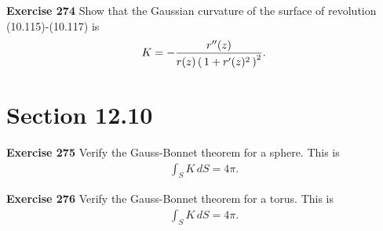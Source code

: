 \documentclass[12pt,a4paper]{report}
\begin{document}
\begin{description}
\item \textbf{Exercise 274} Show that the Gaussian curvature of the surface of revolution (10.115)-(10.117) is
\begin{align*}
	K = -\frac{r''(z)}{r(z)\left (\, 1+r'(z)^2 \,\right )^2}.
\end{align*}

\section*{Section 12.10}
\item \textbf{Exercise 275} Verify the Gauss-Bonnet theorem for a sphere.  This is
\begin{align*}
	\int_S K\,dS = 4\pi.
\end{align*}

\item \textbf{Exercise 276} Verify the Gauss-Bonnet theorem for a torus.  This is
\begin{align*}
	\int_S K\,dS = 4\pi.
\end{align*}

\end{description}
\end{document}
